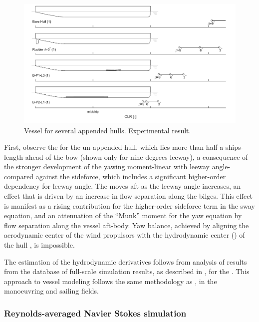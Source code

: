 \documentclass[twoside,twocolumn]{article}
\begin{document}
\begin{figure}[!th]
	\centering
	\includegraphics[width=\textwidth]{images/1_CLR_demo}
	\caption{Vessel \CLR for several appended hulls. Experimental result.}
	\label{fig:CLRdemo}
\end{figure}
\noindent
First, observe the \CLR for the un-appended hull, which lies more than half a ships-length ahead of the bow (shown only for nine degrees leeway), a consequence of the stronger development of the yawing moment-linear with leeway angle-compared against the sideforce, which includes a significant higher-order dependency for leeway angle. The \CLR moves aft as the leeway angle increases, an effect that is driven by an increase in flow separation along the bilges. This effect is manifest as a rising contribution for the higher-order sideforce term in the sway equation, and an attenuation of the “Munk” moment for the yaw equation by flow separation along the vessel aft-body. Yaw balance, achieved by aligning the aerodynamic center of the wind propulsors with the hydrodynamic center (\CLR) of the hull \cite{Claughton03}, is impossible.

The estimation of the hydrodynamic derivatives follows from analysis of results from the database of full-scale simulation results, as described in \cite{Kolk18c,Kolk19d}, for the \DWA. This approach to vessel modeling follows the same methodology as \citet{Tsakonas1959,Jacobs1966,Inoue1981,Keuning1998,Tox11}, in the manoeuvring and sailing fields.

\subsubsection{Reynolds-averaged Navier Stokes simulation}
\end{document}
